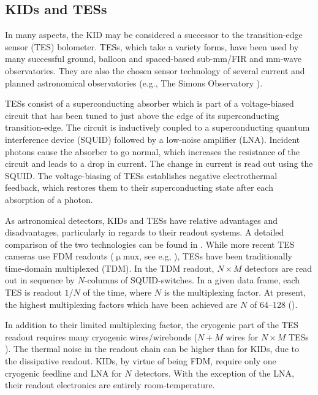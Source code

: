 \subsection{KIDs and TESs}

In many aspects, the KID may be considered a successor to the transition-edge sensor (TES) bolometer. TESs, which take a variety forms, have been used by many successful ground, balloon and spaced-based sub-mm/FIR and mm-wave observatories. They are also the chosen sensor technology of several current and planned astronomical observatories (e.g., The Simons Observatory \citep{ade2019simons}).

TESs consist of a superconducting absorber which is part of a voltage-biased circuit that has been tuned to just above the edge of its superconducting transition-edge. The circuit is inductively coupled to a superconducting quantum interference device (SQUID) followed by a low-noise amplifier (LNA). Incident photons cause the absorber to go normal, which increases the resistance of the circuit and leads to a drop in current. The change in current is read out using the SQUID. The voltage-biasing of TESs establishes negative electrothermal feedback, which restores them to their superconducting state after each absorption of a photon.

As astronomical detectors, KIDs and TESs have relative advantages and disadvantages, particularly in regards to their readout systems. A detailed comparison of the two technologies can be found in \citet{mauskopf2018transition}. While more recent TES cameras use FDM readouts ($\upmu$mux, see e.g, \citet{stanchfield2016development}), TESs have been traditionally time-domain multiplexed (TDM). In the TDM readout, $N \times M$ detectors are read out in sequence by $N$-columns of SQUID-switches. In a given data frame, each TES is readout $1/N$ of the time, where $N$ is the multiplexing factor. At present, the highest multiplexing factors which have been achieved are $N$ of 64--128 (\citet{henderson2016advanced,mates2017simultaneous}).

In addition to their limited multiplexing factor, the cryogenic part of the TES readout requires many cryogenic wires/wirebonds ($N + M$ wires for $N \times M$ TESs \citep{mauskopf2018transition}). The thermal noise in the readout chain can be higher than for KIDs, due to the dissipative readout. KIDs, by virtue of being FDM, require only one cryogenic feedline and LNA for $N$ detectors. With the exception of the LNA, their readout electronics are entirely room-temperature.


